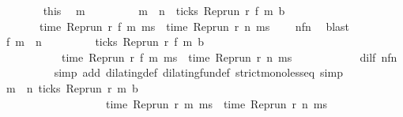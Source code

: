 \begin{isabellebody}
\ \ \ \ \ \ \isamarkupfalse%
\ this\ \isamarkupfalse%
\ m\ \isanewline
\ \ \ \ \ \ \ \ {\isacartoucheopen}m\ {\isasymge}\ n\ {\isasymand}\ ticks\ {\isacharparenleft}{\isacharparenleft}Rep{\isacharunderscore}run\ r{\isacharparenright}\ {\isacharparenleft}f\ m\ b{\isacharparenright}\isanewline
\ \ \ \ \ \ {\isasymand}\ {\isacharparenleft}time\ {\isacharparenleft}{\isacharparenleft}Rep{\isacharunderscore}run\ r{\isacharparenright}\ {\isacharparenleft}f\ m\ ms{\isacharparenright}\ {\isacharequal}\ time\ {\isacharparenleft}{\isacharparenleft}Rep{\isacharunderscore}run\ r{\isacharparenright}\ n\ ms{\isacharparenright}\ {\isacharplus}\ {\isasymdelta}{\isasymtau}{\isacharparenright}{\isacartoucheclose}\ \isamarkupfalse%
\ nfn{}\ \isamarkupfalse%
\ blast\isanewline
\ \ \ \ \ \ \isamarkupfalse%
\ {\isacartoucheopen}f\ m\ {\isasymge}\ n{\isacartoucheclose}\isanewline
\ \ \ \ \ \ \ \ \ {\isacartoucheopen}ticks\ {\isacharparenleft}{\isacharparenleft}Rep{\isacharunderscore}run\ r{\isacharparenright}\ {\isacharparenleft}f\ m\ b{\isacharparenright}\isanewline
\ \ \ \ \ \ \ \ \ \ {\isasymand}\ {\isacharparenleft}time\ {\isacharparenleft}{\isacharparenleft}Rep{\isacharunderscore}run\ r{\isacharparenright}\ {\isacharparenleft}f\ m\ ms{\isacharparenright}\ {\isacharequal}\ time\ {\isacharparenleft}{\isacharparenleft}Rep{\isacharunderscore}run\ r{\isacharparenright}\ n\ ms{\isacharparenright}\ {\isacharplus}\ {\isasymdelta}{\isasymtau}{\isacharparenright}{\isacartoucheclose}\isanewline
\ \ \ \ \ \ \ \ \isamarkupfalse%
\ dilf\ nfn{}\isanewline
\ \ \ \ \ \ \ \ \isamarkupfalse%
\ {\isacharparenleft}simp\ add{\isacharcolon}\ dilating{\isacharunderscore}def\ dilating{\isacharunderscore}fun{\isacharunderscore}def\ strict{\isacharunderscore}mono{\isacharunderscore}less{\isacharunderscore}eq{\isacharcomma}\ simp{\isacharparenright}\isanewline
\ \ \ \ \ \ \isamarkupfalse%
\ {\isacartoucheopen}{\isacharparenleft}{\isasymexists}m\ {\isasymge}\ n{\isachardot}\ ticks\ {\isacharparenleft}{\isacharparenleft}Rep{\isacharunderscore}run\ r{\isacharparenright}\ m\ b{\isacharparenright}\isanewline
\ \ \ \ \ \ \ \ \ \ \ \ \ \ \ \ \ \ {\isasymand}\ time\ {\isacharparenleft}{\isacharparenleft}Rep{\isacharunderscore}run\ r{\isacharparenright}\ m\ ms{\isacharparenright}\ {\isacharequal}\ time\ {\isacharparenleft}{\isacharparenleft}Rep{\isacharunderscore}run\ r{\isacharparenright}\ n\ ms{\isacharparenright}\ {\isacharplus}\ {\isasymdelta}{\isasymtau}{\isacharparenright}{\isacartoucheclose}\ \isamarkupfalse%

\end{isabellebody}
